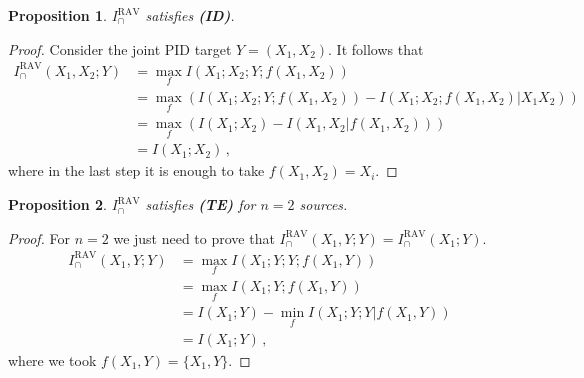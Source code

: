 \documentclass{article}
\newcommand{\ID}{\textbf{(ID)}\xspace} %
\newcommand{\TE}{\textbf{(TE)}\xspace} %
\newcommand{\IRAV}{\ensuremath{I_\cap^{\text{RAV}}}\xspace}
\newcommand{\IRAVs}{\ensuremath{I_\cap^{\text{RAV}}(X_1,X_2;Y)}\xspace}
\newtheorem{proposition}{Proposition}
\begin{document}
\begin{proposition} \label{prop:RAV-ID}
    $\IRAV$ satisfies \ID.
\end{proposition}
\begin{proof}
    Consider the joint PID target $Y=(X_1,X_2)$. It follows that
    \begin{equation}
        \begin{aligned}
            \IRAVs & = \max_f I(X_1;X_2;Y;f(X_1,X_2)) \\
            & = \max_f \left( I(X_1;X_2;Y;f(X_1,X_2)) - I(X_1;X_2;f(X_1,X_2)|X_1X_2)\right) \\
            & = \max_f \left( I(X_1;X_2) - I(X_1,X_2|f(X_1,X_2)) \right) \\
            & = I(X_1;X_2) \,,
        \end{aligned}
    \end{equation}
    where in the last step it is enough to take $f(X_1,X_2)=X_i$. 
    \end{proof}

\begin{proposition}\label{prop:RAV-TE}
    $\IRAV$ satisfies \TE for $n=2$ sources.
\end{proposition}
\begin{proof}
    For $n=2$ we just need to prove that $\IRAV(X_1,Y;Y)=\IRAV(X_1;Y)$.
    \begin{equation}
        \begin{aligned}
            \IRAV(X_1,Y;Y) & = \max_f I(X_1;Y;Y;f(X_1,Y)) \\
            & = \max_f I(X_1;Y;f(X_1,Y)) \\
            & = I(X_1;Y) - \min_f I(X_1;Y;Y|f(X_1,Y)) \\
            & = I(X_1;Y) \,,
        \end{aligned}
    \end{equation}
    where we took $f(X_1,Y)=\{X_1,Y\}$.
\end{proof}
\end{document}
